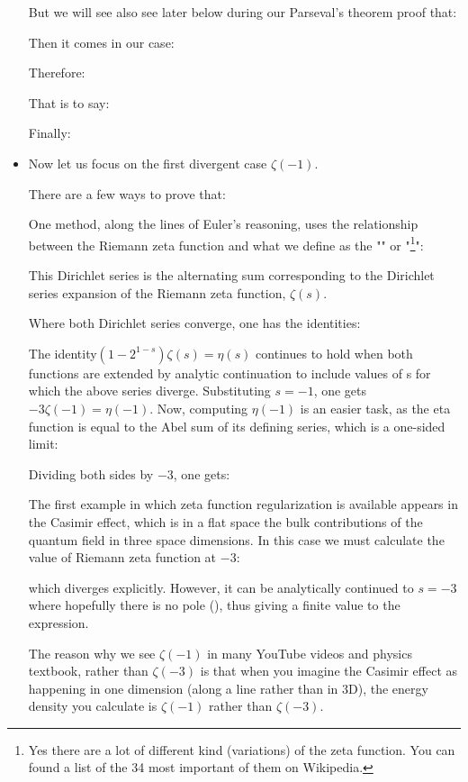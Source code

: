 \begin{itemize}
		But we will see also see later below during our Parseval's theorem proof that:
		
		Then it comes in our case:
		
		Therefore:
		
		That is to say:
		
		Finally:
		
		
		\item Now let us focus on the first divergent case $\zeta(-1)$. 
		
		There are a few ways to prove that:
		
		One method, along the lines of Euler's reasoning, uses the relationship between the Riemann zeta function and what we define as the "" or "\footnote{Yes there are a lot of different kind (variations) of the zeta function. You can found a list of the 34 most important of them on Wikipedia.}":
		
		This Dirichlet series is the alternating sum corresponding to the Dirichlet series expansion of the Riemann zeta function, $\zeta(s)$.
		
		Where both Dirichlet series converge, one has the identities:
		
		The identity$(1-2^{1-s})\zeta (s)=\eta (s)$ continues to hold when both functions are extended by analytic continuation to include values of s for which the above series diverge. Substituting $s=-1$, one gets $-3\zeta(-1) = \eta(-1)$. Now, computing $\eta(-1)$ is an easier task, as the eta function is equal to the Abel sum of its defining series, which is a one-sided limit:
		
		Dividing both sides by $-3$, one gets:
		
		 The first example in which zeta function regularization is available appears in the Casimir effect, which is in a flat space the bulk contributions of the quantum field in three space dimensions. In this case we must calculate the value of Riemann zeta function at $-3$:
		
		  which diverges explicitly. However, it can be analytically continued to $s=-3$ where hopefully there is no pole (), thus giving a finite value to the expression.
		 \begin{tcolorbox}[title=Remark,colframe=black,arc=10pt]
		The reason why we see $\zeta(-1)$ in many YouTube videos and physics textbook, rather than $\zeta(-3)$ is that when you imagine the Casimir effect as happening in one dimension (along a line rather than in $3$D), the energy density you calculate is $\zeta(-1)$ rather than $\zeta(-3)$.
		\end{tcolorbox}
		

\end{itemize}
